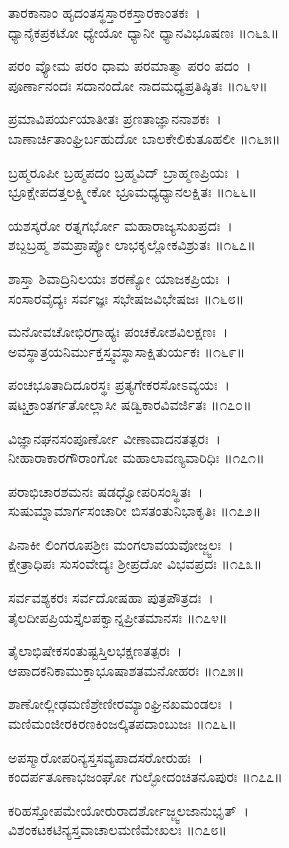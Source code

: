 ತಾರಕಾನಾಂ ಹೃದಂತಸ್ಥಸ್ತಾರಕಸ್ತಾರಕಾಂತಕಃ~।\\
ಧ್ಯಾನೈಕಪ್ರಕಟೋ ಧ್ಯೇಯೋ ಧ್ಯಾನೀ ಧ್ಯಾನವಿಭೂಷಣಃ ॥೧೬೩॥

	ಪರಂ ವ್ಯೋಮ ಪರಂ ಧಾಮ ಪರಮಾತ್ಮಾ ಪರಂ ಪದಂ~।\\
	ಪೂರ್ಣಾನಂದಃ ಸದಾನಂದೋ ನಾದಮಧ್ಯಪ್ರತಿಷ್ಠಿತಃ ॥೧೬೪॥

ಪ್ರಮಾವಿಪರ್ಯಯಾತೀತಃ ಪ್ರಣತಾಜ್ಞಾನನಾಶಕಃ~।\\
ಬಾಣಾರ್ಚಿತಾಂಘ್ರಿರ್ಬಹುದೋ ಬಾಲಕೇಲಿಕುತೂಹಲೀ ॥೧೬೫॥

	ಬ್ರಹ್ಮರೂಪೀ ಬ್ರಹ್ಮಪದಂ ಬ್ರಹ್ಮವಿದ್ ಬ್ರಾಹ್ಮಣಪ್ರಿಯಃ~।\\
	ಭ್ರೂಕ್ಷೇಪದತ್ತಲಕ್ಷ್ಮೀಕೋ ಭ್ರೂಮಧ್ಯಧ್ಯಾನಲಕ್ಷಿತಃ ॥೧೬೬॥

ಯಶಸ್ಕರೋ ರತ್ನಗರ್ಭೋ ಮಹಾರಾಜ್ಯಸುಖಪ್ರದಃ~।\\
ಶಬ್ದಬ್ರಹ್ಮ ಶಮಪ್ರಾಪ್ಯೋ ಲಾಭಕೃಲ್ಲೋಕವಿಶ್ರುತಃ ॥೧೬೭॥

	ಶಾಸ್ತಾ ಶಿವಾದ್ರಿನಿಲಯಃ ಶರಣ್ಯೋ ಯಾಜಕಪ್ರಿಯಃ~।\\
	ಸಂಸಾರವೈದ್ಯಃ ಸರ್ವಜ್ಞಃ ಸಭೇಷಜವಿಭೇಷಜಃ ॥೧೬೮॥

ಮನೋವಚೋಭಿರಗ್ರಾಹ್ಯಃ ಪಂಚಕೋಶವಿಲಕ್ಷಣಃ~।\\
ಅವಸ್ಥಾತ್ರಯನಿರ್ಮುಕ್ತಸ್ತ್ವವಸ್ಥಾಸಾಕ್ಷಿತುರ್ಯಕಃ ॥೧೬೯॥

	ಪಂಚಭೂತಾದಿದೂರಸ್ಥಃ ಪ್ರತ್ಯಗೇಕರಸೋಽವ್ಯಯಃ~।\\
	ಷಟ್ಚಕ್ರಾಂತರ್ಗತೋಲ್ಲಾಸೀ ಷಡ್ವಿಕಾರವಿವರ್ಜಿತಃ ॥೧೭೦॥

ವಿಜ್ಞಾನಘನಸಂಪೂರ್ಣೋ ವೀಣಾವಾದನತತ್ಪರಃ~।\\
ನೀಹಾರಾಕಾರಗೌರಾಂಗೋ ಮಹಾಲಾವಣ್ಯವಾರಿಧಿಃ ॥೧೭೧॥

	ಪರಾಭಿಚಾರಶಮನಃ ಷಡಧ್ವೋಪರಿಸಂಸ್ಥಿತಃ~।\\
	ಸುಷುಮ್ನಾಮಾರ್ಗಸಂಚಾರೀ ಬಿಸತಂತುನಿಭಾಕೃತಿಃ ॥೧೭೨॥

ಪಿನಾಕೀ ಲಿಂಗರೂಪಶ್ರೀಃ ಮಂಗಲಾವಯವೋಜ್ಜ್ವಲಃ~।\\
ಕ್ಷೇತ್ರಾಧಿಪಃ ಸುಸಂವೇದ್ಯಃ ಶ್ರೀಪ್ರದೋ ವಿಭವಪ್ರದಃ ॥೧೭೩॥

	ಸರ್ವವಶ್ಯಕರಃ ಸರ್ವದೋಷಹಾ ಪುತ್ರಪೌತ್ರದಃ~।\\
	ತೈಲದೀಪಪ್ರಿಯಸ್ತೈಲಪಕ್ವಾನ್ನಪ್ರೀತಮಾನಸಃ ॥೧೭೪॥

ತೈಲಾಭಿಷೇಕಸಂತುಷ್ಟಸ್ತಿಲಭಕ್ಷಣತತ್ಪರಃ~।\\
ಆಪಾದಕನಿಕಾಮುಕ್ತಾಭೂಷಾಶತಮನೋಹರಃ ॥೧೭೫॥

	ಶಾಣೋಲ್ಲೀಢಮಣಿಶ್ರೇಣೀರಮ್ಯಾಂಘ್ರಿನಖಮಂಡಲಃ~।\\
	ಮಣಿಮಂಜೀರಕಿರಣಕಿಂಜಲ್ಕಿತಪದಾಂಬುಜಃ ॥೧೭೬॥

ಅಪಸ್ಮಾರೋಪರಿನ್ಯಸ್ತಸವ್ಯಪಾದಸರೋರುಹಃ~।\\
ಕಂದರ್ಪತೂಣಾಭಜಂಘೋ ಗುಲ್ಫೋದಂಚಿತನೂಪುರಃ ॥೧೭೭॥

	ಕರಿಹಸ್ತೋಪಮೇಯೋರುರಾದರ್ಶೋಜ್ಜ್ವಲಜಾನುಭೃತ್~।\\
	ವಿಶಂಕಟಕಟಿನ್ಯಸ್ತವಾಚಾಲಮಣಿಮೇಖಲಃ ॥೧೭೮॥

